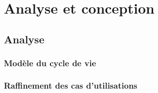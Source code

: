 \chapter{Analyse et conception}


\thispagestyle{empty}

\newpage



\headrule




 \section{Analyse}
 
\subsection{Modèle du cycle de vie}

\subsection{Raffinement des cas d'utilisations}

